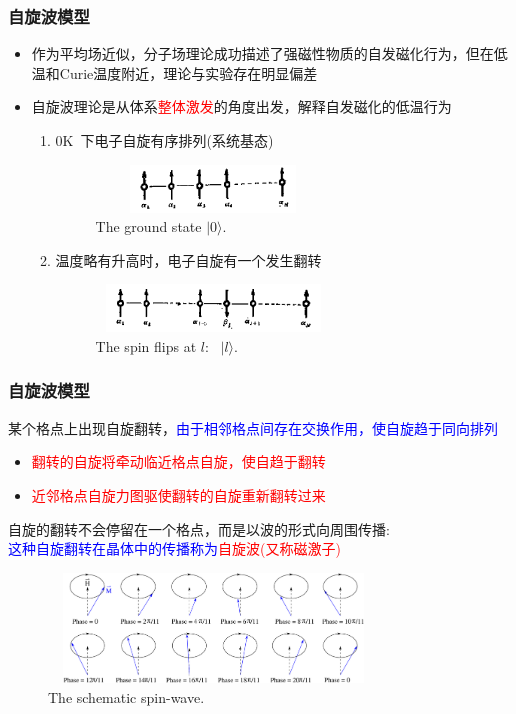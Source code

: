 \documentclass[cjk,slidestop,compress,mathserif,blue]{beamer}
\begin{document}
\frame
{
	\frametitle{自旋波模型}
	\begin{itemize}
		\item 作为平均场近似，分子场理论成功描述了强磁性物质的自发磁化行为，但在低温和\textrm{Curie}温度附近，理论与实验存在明显偏差
		\item 自旋波理论是从体系\textcolor{red}{整体激发}的角度出发，解释自发磁化的低温行为
			\begin{enumerate}
				\item 0\textrm{K~}下电子自旋有序排列(系统基态)
\begin{figure}[h!]
\centering
\includegraphics[height=0.50in,width=2.45in,viewport=10 10 600 150,clip]{Figures/Mag_spinwave-0.png}
\caption{\tiny \textrm{The ground state $|0\rangle$.}}%
\label{Mag_spinwave-0}
\end{figure}
				\item 温度略有升高时，电子自旋有一个发生翻转
\begin{figure}[h!]
\centering
\includegraphics[height=0.50in,width=2.45in,viewport=10 10 680 150,clip]{Figures/Mag_spinwave-1.png}
\caption{\tiny \textrm{The spin flips at $l$:~ $|l\rangle$.}}%
\label{Mag_spinwave-1}
\end{figure}
			\end{enumerate}
	\end{itemize}
}

\frame
{
	\frametitle{自旋波模型}
	某个格点上出现自旋翻转，\textcolor{blue}{由于相邻格点间存在交换作用，使自旋趋于同向排列}
	\begin{itemize}
		\item \textcolor{red}{翻转的自旋将牵动临近格点自旋，使自趋于翻转}
		\item \textcolor{red}{近邻格点自旋力图驱使翻转的自旋重新翻转过来}
	\end{itemize}
	自旋的翻转不会停留在一个格点，而是以波的形式向周围传播:\\
	\textcolor{blue}{这种自旋翻转在晶体中的传播称为}\textcolor{red}{自旋波(又称磁激子)}
\begin{figure}[h!]
\centering
\includegraphics[height=1.15in,width=3.45in,viewport=0 0 830 300,clip]{Figures/Mag_spinwave-2.png}
\caption{\tiny \textrm{The schematic spin-wave.}}%
\label{Mag_spinwave-2}
\end{figure}
}
\end{document}
